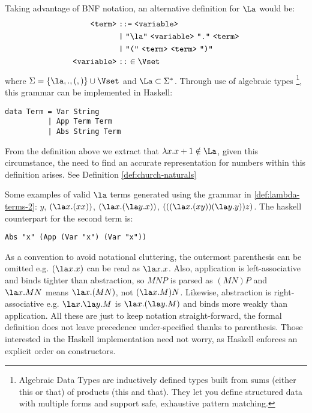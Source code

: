 \begin{definition} Taking advantage of BNF notation, an alternative definition for $\La$ would be:
  \label{def:lambda-terms-2}
  \begin{align*}
    \texttt{<term>} &\;\texttt{::=}\; \texttt{<variable>} \\
                    &\;\texttt{|}\; \texttt{"$\la$"}\ \texttt{<variable>}\ \texttt{"."}\ \texttt{<term>} \\
                    &\;\texttt{|}\; \texttt{"("}\ \texttt{<term>}\ \texttt{<term>}\ \texttt{")"} \\
    \texttt{<variable>} &\;\texttt{::}\in \Vset
  \end{align*}
  where \( \Sigma = \{ \la, ., (, )\} \cup \Vset \) and \( \La \subset \Sigma^* \). Through use of algebraic types \footnote{Algebraic Data Types are inductively defined types built from sums (either this or that) of products (this and that). They let you define structured data with multiple forms and support safe, exhaustive pattern matching. }, this grammar can be implemented in Haskell:
  \begin{lstlisting}[style=haskellstyle,caption={Grammar implementation of the \lcalc \ language using Haskell's algebraic types}]
data Term = Var String
          | App Term Term
          | Abs String Term
\end{lstlisting}

\end{definition}
\begin{remark}
  From the definition above we extract that \( \lambda x . x + 1 \notin \La \), given this circumstance, the need to find an accurate representation for numbers within this definition arises. See Definition \ref{def:church-naturals}
\end{remark}
\begin{example} \label{ex:lambda-terms} Some examples of valid $\la$ terms generated using the grammar in \ref{def:lambda-terms-2}:
  \( y \),
  \( (\la x. (x x)) \),
  \( (\la x. (\la y. x)) \),
  \( (((\la x. (x y)) (\la y. y)) z) \).
  The haskell counterpart for the second term is:
  \begin{lstlisting}[style=haskellstyle,caption={Haskell interpretation of the second term}]
Abs "x" (App (Var "x") (Var "x"))
  \end{lstlisting}
\end{example}
As a convention to avoid notational cluttering, the outermost parenthesis can be omitted e.g. $ ( \la x.x ) $ can be read as $ \la x.x $. Also, application is left-associative  and binds tighter than abstraction, so $M N P$ is parsed as $(M N) P$ and $\la x . M N$ means $\la x . (M N)$, not $(\la x . M) N$. Likewise, abstraction is right-associative e.g. $\la x . \la y . M$ is $\la x . (\la y . M)$ and binds more weakly than application. All these are just to keep notation straight-forward, the formal definition does not leave precedence under-specified thanks to parenthesis. Those interested in the Haskell implementation need not worry, as Haskell enforces an explicit order on constructors.
